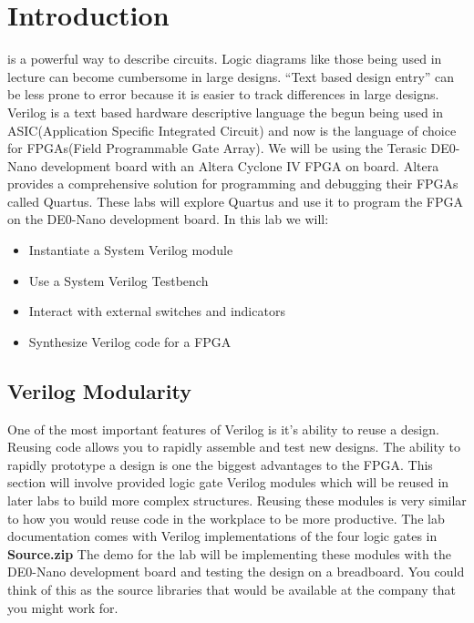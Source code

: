 \documentclass[12pt,journal]{IEEEtran}
\begin{document}




  \section{\bfseries Introduction}
     is a powerful way to describe circuits. Logic diagrams like those being used in lecture 
    can become cumbersome in large designs. ``Text based design entry'' can be less prone to error because 
    it is easier to track differences in large designs. Verilog is a text based hardware descriptive language
    the begun being used in ASIC(Application Specific Integrated Circuit) and now is the language of choice for
    FPGAs(Field Programmable Gate Array). We will be using the Terasic DE0-Nano development board with an Altera 
    Cyclone IV FPGA on board. Altera provides a comprehensive solution for programming and debugging their FPGAs 
    called Quartus. These labs will explore Quartus and use it to program the FPGA on the DE0-Nano development 
    board. In this lab we will:
    \begin{itemize}
      \item Instantiate a System Verilog module
      \item Use a System Verilog Testbench
      \item Interact with external switches and indicators
      \item Synthesize Verilog code for a FPGA
    \end{itemize}
  
    \subsection{\bfseries Verilog Modularity}
      One of the most important features of Verilog is it's ability to reuse a design. Reusing code allows you to
      rapidly assemble and test new designs. The ability to rapidly prototype a design is one the biggest advantages 
      to the FPGA. This section will involve provided logic gate Verilog modules which will be reused in later labs to 
      build more complex structures. Reusing these modules is very similar to how you would reuse code in the workplace 
      to be more productive. The lab documentation comes with Verilog implementations of the four logic gates in 
      {\bfseries Source.zip} The demo for the lab will be implementing these modules with the DE0-Nano development
      board and testing the design on a breadboard. You could think of this as the source libraries that would
      be available at the company that you might work for. 
\end{document}
